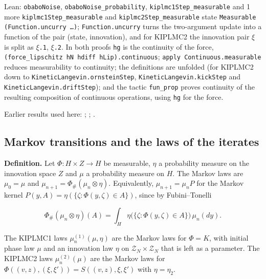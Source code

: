 \documentclass[11pt,a4paper]{report}
\begin{document}
\begin{leanbox}{Lean: \texttt{obaboNoise}, \texttt{obaboNoise\_\allowbreak{}probability}, \texttt{kiplmc1Step\_\allowbreak{}measurable} and 1 more}
\texttt{kiplmc1\allowbreak{}Step\_\allowbreak{}measurable} and \texttt{kiplmc2\allowbreak{}Step\_\allowbreak{}measurable} state \texttt{Measurable (Function.\allowbreak{}uncurry …)}; \texttt{Function.\allowbreak{}uncurry} turns the two-argument update into a function of the pair (state, innovation), and for KIPLMC2 the innovation pair \texttt{\ensuremath{\xi}} is split as \texttt{\ensuremath{\xi}.\allowbreak{}1}, \texttt{\ensuremath{\xi}.\allowbreak{}2}. In both proofs \texttt{hg} is the continuity of the force, \texttt{(force\_\allowbreak{}lipschitz h\allowbreak{}N hdiff h\allowbreak{}Lip).\allowbreak{}continuous}; \texttt{apply Continuous.\allowbreak{}measurable} reduces measurability to continuity; the definitions are unfolded (for KIPLMC2 down to \texttt{Kinetic\allowbreak{}Langevin.\allowbreak{}ornstein\allowbreak{}Step}, \texttt{Kinetic\allowbreak{}Langevin.\allowbreak{}kick\allowbreak{}Step} and \texttt{Kinetic\allowbreak{}Langevin.\allowbreak{}drift\allowbreak{}Step}); and the tactic \texttt{fun\_\allowbreak{}prop} proves continuity of the resulting composition of continuous operations, using \texttt{hg} for the force.
\end{leanbox}


Earlier results used here: \cite[Section~3.1.1]{LangevinLean2026IPLA}; \cite[Section~3.12.2]{LangevinLean2026Kinetic}; \cite[Section~3.20.1]{LangevinLean2026Kinetic}.
\subsection{\texorpdfstring{Markov transitions and the laws of the iterates}{Markov transitions and the laws of the iterates}}
\label{report-step-KIPLMC-Laws-lean-2}


\textbf{Definition.} Let \(\Phi:H\times Z\to H\) be measurable, \(\eta\) a probability measure on the innovation space \(Z\) and \(\mu\) a probability measure on \(H\). The Markov laws are \(\mu_0=\mu\) and \(\mu_{n+1}=\Phi_\#(\mu_n\otimes\eta)\). Equivalently, \(\mu_{n+1}=\mu_nP\) for the Markov kernel \(P(y,A)=\eta(\{\zeta:\Phi(y,\zeta)\in A\})\), since by Fubini–Tonelli


\[\Phi_\#(\mu_n\otimes\eta)(A)=\int_H\eta\bigl(\{\zeta:\Phi(y,\zeta)\in A\}\bigr)\,\mu_n(dy).\]


The KIPLMC1 laws \(\mu^{(1)}_n(\mu,\eta)\) are the Markov laws for \(\Phi=K\), with initial phase law \(\mu\) and an innovation law \(\eta\) on \(\mathcal Z_N\times\mathcal Z_N\) that is left as a parameter. The KIPLMC2 laws \(\mu^{(2)}_n(\mu)\) are the Markov laws for \(\Phi((v,z),(\xi,\xi'))=S((v,z),\xi,\xi')\) with \(\eta=\eta_2\).
\end{document}
